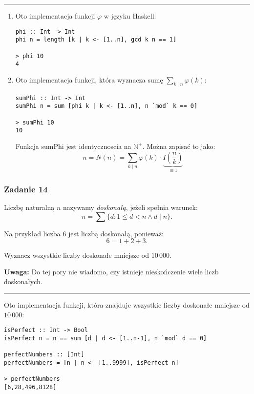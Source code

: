 \documentclass[11pt,a4paper]{article}
\begin{document}
\bigskip
\hrule
\bigskip

\begin{enumerate}
    \item Oto implementacja funkcji \(\varphi\) w języku Haskell:
        \begin{Verbatim}[frame=single]
phi :: Int -> Int
phi n = length [k | k <- [1..n], gcd k n == 1]

> phi 10
4
        \end{Verbatim}
    \item Oto implementacja funkcji, która wyznacza sumę \(\sum_{k \mid n} \varphi(k)\):
        \begin{Verbatim}[frame=single]
sumPhi :: Int -> Int
sumPhi n = sum [phi k | k <- [1..n], n `mod` k == 0]

> sumPhi 10
10
        \end{Verbatim}
        Funkcja sumPhi jest identycznoscia na $\mathbb{N}^+$. Można zapisać to jako:
        \[
            n =N(n)= \sum_{k \mid n} \varphi(k) \cdot \underbrace{I(\frac{n}{k})}_{\equiv 1}
        \]
\end{enumerate}

\subsubsection{Zadanie 14}
Liczbę naturalną \(n\) nazywamy \textit{doskonałą}, jeżeli spełnia warunek:
\begin{equation}
    n = \sum \{ d : 1 \leq d < n \land d \mid n \}.
\end{equation}

Na przykład liczba \(6\) jest liczbą doskonałą, ponieważ:
\begin{equation}
    6 = 1 + 2 + 3.
\end{equation}

Wyznacz wszystkie liczby doskonałe mniejsze od \(10\,000\).

\textbf{Uwaga:} Do tej pory nie wiadomo, czy istnieje nieskończenie wiele liczb doskonałych.

\bigskip
\hrule
\bigskip

Oto implementacja funkcji, która znajduje wszystkie liczby doskonałe mniejsze od \(10\,000\):
\begin{Verbatim}[frame=single]
isPerfect :: Int -> Bool
isPerfect n = n == sum [d | d <- [1..n-1], n `mod` d == 0]

perfectNumbers :: [Int]
perfectNumbers = [n | n <- [1..9999], isPerfect n]

> perfectNumbers
[6,28,496,8128]
\end{Verbatim}
\end{document}
